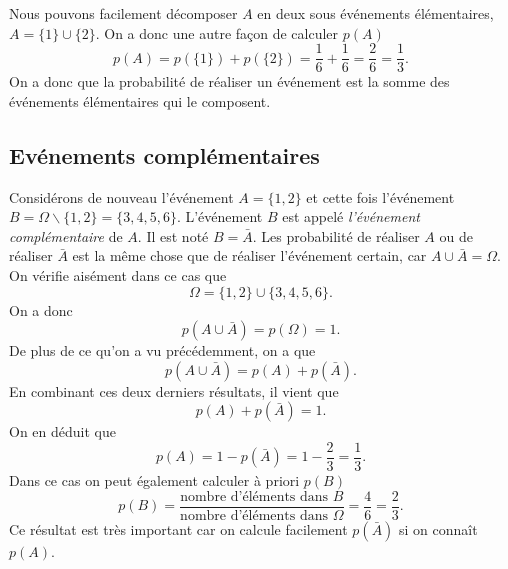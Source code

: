 \documentclass[a4paper,12pt]{book}
\begin{document}
Nous pouvons facilement décomposer $A$ en deux sous événements élémentaires, $A=\{1\}\cup \{2\}$.
On a donc une autre façon de calculer $p(A)$
\begin{equation}
p(A)=p(\{1\})+p(\{2\})=\frac{1}{6}+\frac{1}{6}=\frac{2}{6}=\frac{1}{3}.
\end{equation}
On a donc que la probabilité de réaliser un événement est la somme des événements élémentaires qui le composent.

\subsection{Evénements complémentaires}
Considérons de nouveau l'événement $A=\{1,2\}$ et cette fois l'événement $B=\Omega\backslash \{1,2\}=\{3,4,5,6\}$. L'événement 
$B$ est appelé \textit{l'événement complémentaire} de $A$. Il est noté $B=\bar A$. Les probabilité de réaliser $A$ ou de réaliser
$\bar A$ est la même chose que de réaliser l'événement certain, car $A\cup \bar A=\Omega$. 
On vérifie aisément dans ce cas que 
\begin{equation}
 \Omega=\{1,2\}\cup\{3,4,5,6\}.
\end{equation}
On a donc 
\begin{equation}
 p(A\cup \bar A)=p(\Omega)=1.
\end{equation}
De plus de ce qu'on a vu précédemment,
on a que 
\begin{equation}
p(A\cup \bar A)=p(A)+p(\bar A).
\end{equation}
En combinant ces deux derniers résultats, il vient que
\begin{equation}
p(A)+p(\bar A)=1.
\end{equation}
On en déduit que 
\begin{equation}
p(A)=1-p(\bar A)=1-\frac{2}{3}=\frac{1}{3}.
\end{equation}
Dans ce cas on peut également calculer à priori $p(B)$
\begin{equation}
p(B)=\frac{\mbox{nombre d'éléments dans }B}{\mbox{nombre d'éléments dans }\Omega}=\frac{4}{6}=\frac{2}{3}.
\end{equation}
Ce résultat est très important car on calcule facilement $p(\bar A)$ si on connaît $p(A)$.
\end{document}
